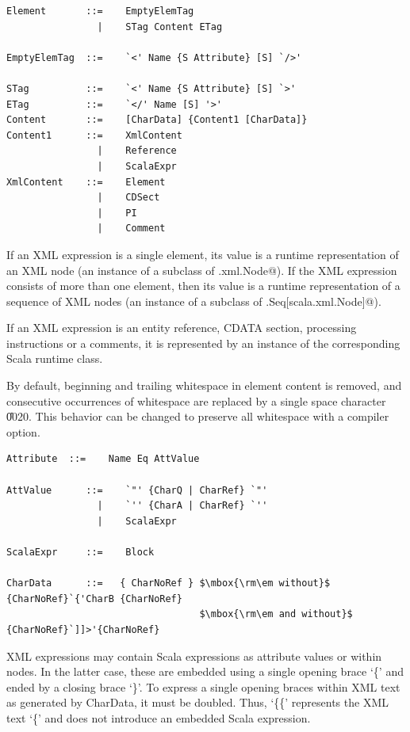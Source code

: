 \syntax\begin{lstlisting}
Element       ::=    EmptyElemTag
                |    STag Content ETag                                       

EmptyElemTag  ::=    `<' Name {S Attribute} [S] `/>'                         

STag          ::=    `<' Name {S Attribute} [S] `>'                          
ETag          ::=    `</' Name [S] '>'                                        
Content       ::=    [CharData] {Content1 [CharData]}
Content1      ::=    XmlContent
                |    Reference
                |    ScalaExpr
XmlContent    ::=    Element
                |    CDSect
                |    PI
                |    Comment
\end{lstlisting}

If an XML expression is a single element, its value is a runtime
representation of an XML node (an instance of a subclass of 
\lstinline@scala.xml.Node@). If the XML expression consists of more
than one element, then its value is a runtime representation of a
sequence of XML nodes (an instance of a subclass of 
\lstinline@scala.Seq[scala.xml.Node]@).

If an XML expression is an entity reference, CDATA section, processing 
instructions or a comments, it is represented by an instance of the 
corresponding Scala runtime class.

By default, beginning and trailing whitespace in element content is removed, 
and consecutive occurrences of whitespace are replaced by a single space
character \U{0020}. This behavior can be changed to preserve all whitespace
with a compiler option.

\syntax\begin{lstlisting}
Attribute  ::=    Name Eq AttValue                                    

AttValue      ::=    `"' {CharQ | CharRef} `"'
                |    `'' {CharA | CharRef} `''
                |    ScalaExpr

ScalaExpr     ::=    Block

CharData      ::=   { CharNoRef } $\mbox{\rm\em without}$ {CharNoRef}`{'CharB {CharNoRef} 
                                  $\mbox{\rm\em and without}$ {CharNoRef}`]]>'{CharNoRef}
\end{lstlisting}
XML expressions may contain Scala expressions as attribute values or
within nodes. In the latter case, these are embedded using a single opening 
brace `\{' and ended by a closing brace `\}'. To express a single opening braces 
within XML text as generated by CharData, it must be doubled. Thus, `\{\{'
represents the XML text `\{' and does not introduce an embedded Scala
expression.


